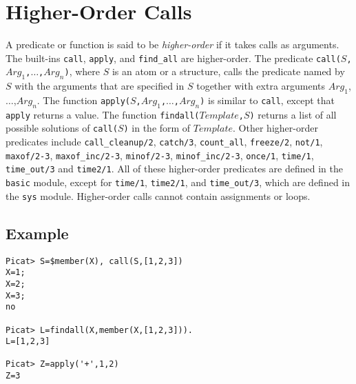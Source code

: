 \section{Higher-Order Calls}
A predicate or function is said to be \emph{higher-order} if it takes calls as arguments. The built-ins \texttt{call}, \texttt{apply}, and \texttt{find\_all} are higher-order. The predicate \texttt{call($S$,$Arg_1$,$\ldots$,$Arg_n$)}, where $S$ is an atom or a structure, calls the predicate named by $S$ with the arguments that are specified in $S$ together with extra arguments $Arg_1$,$\ldots$,$Arg_n$. The function \texttt{apply($S$,$Arg_1$,$\ldots$,$Arg_n$)} is similar to \texttt{call}, except that \texttt{apply} returns a value. The function \texttt{findall($Template$,$S$)} returns a list of all possible solutions of \texttt{call($S$)} in the form of $Template$. Other higher-order predicates include \texttt{call\_cleanup/2}, \texttt{catch/3}, \texttt{count\_all}, \texttt{freeze/2}, \texttt{not/1}, \texttt{maxof/2-3}, \texttt{maxof\_inc/2-3}, \texttt{minof/2-3}, \texttt{minof\_inc/2-3}, \texttt{once/1},  \texttt{time/1}, \texttt{time\_out/3} and \texttt{time2/1}. All of these higher-order predicates are defined in the {\tt basic} module, except for \texttt{time/1}, \texttt{time2/1}, and \texttt{time\_out/3}, which are defined in the {\tt sys} module. Higher-order calls cannot contain assignments or loops.

\subsection*{Example}
\begin{verbatim}
Picat> S=$member(X), call(S,[1,2,3])
X=1;
X=2;
X=3;
no

Picat> L=findall(X,member(X,[1,2,3])).
L=[1,2,3]

Picat> Z=apply('+',1,2)
Z=3
\end{verbatim}

